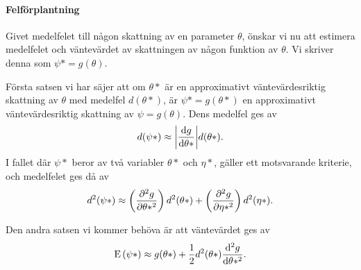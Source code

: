 \paragraph{Felförplantning}

Givet medelfelet till någon skattning av en parameter $\theta$, önskar vi nu att estimera medelfelet och väntevärdet av skattningen av någon funktion av $\theta$. Vi skriver denna som $\psi* = g(\theta)$.

Första satsen vi har säjer att om $\theta*$ är en approximativt väntevärdesriktig skattning av $\theta$ med medelfel $d(\theta*)$, är $\psi* = g(\theta*)$ en approximativt väntevärdesriktig skattning av $\psi = g(\theta)$. Dens medelfel ges av
\begin{align*}
	d(\psi*)\approx\abs{\dv{g}{\theta*} (\theta*)}d(\theta*).
\end{align*}
I fallet där $\psi*$ beror av två variabler $\theta*$ och $\eta*$, gäller ett motsvarande kriterie, och medelfelet ges då av
\begin{align*}
	d^2(\psi*)\approx\left(\pdv[2]{g}{\theta*} (\theta*, \eta*)\right)d^2(\theta*) + \left(\pdv[2]{g}{\eta*} (\theta*, \eta*)\right)d^2(\eta*).
\end{align*}

Den andra satsen vi kommer behöva är att väntevärdet ges av
\begin{align*}
	\text{E}\left(\psi*\right)\approx g(\theta*) + \frac{1}{2}d^2(\theta*)\dv[2]{g}{\theta*} (\theta*).
\end{align*}